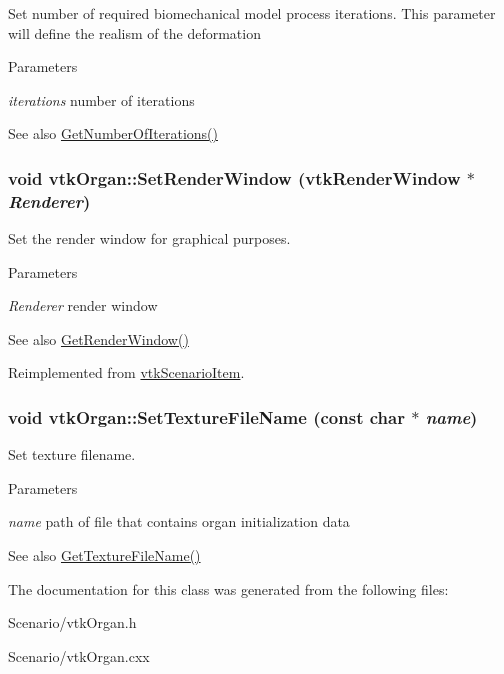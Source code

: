 Set number of required biomechanical model process iterations. This parameter will define the realism of the deformation 
\begin{DoxyParams}{Parameters}
\item[{\em iterations}]number of iterations \end{DoxyParams}
\begin{DoxySeeAlso}{See also}
\hyperlink{classvtkOrgan_a99aeadb34310d5ad8b7d8616ea8482ef}{GetNumberOfIterations()} 
\end{DoxySeeAlso}
\hypertarget{classvtkOrgan_a2b6a862da0f1ca6cd192138cdd00b04b}{
\subsubsection[{SetRenderWindow}]{\setlength{\rightskip}{0pt plus 5cm}void vtkOrgan::SetRenderWindow (vtkRenderWindow $\ast$ {\em Renderer})}}
\label{classvtkOrgan_a2b6a862da0f1ca6cd192138cdd00b04b}


Set the render window for graphical purposes. 
\begin{DoxyParams}{Parameters}
\item[{\em Renderer}]render window \end{DoxyParams}
\begin{DoxySeeAlso}{See also}
\hyperlink{classvtkOrgan_ae670e2727313073a9659a2795ce64c98}{GetRenderWindow()} 
\end{DoxySeeAlso}


Reimplemented from \hyperlink{classvtkScenarioItem_a3ce404404d36c342b947f29fa02b6170}{vtkScenarioItem}.\hypertarget{classvtkOrgan_af19a32e071ae5f9c9848b2ad7088d0c1}{
\subsubsection[{SetTextureFileName}]{\setlength{\rightskip}{0pt plus 5cm}void vtkOrgan::SetTextureFileName (const char $\ast$ {\em name})}}
\label{classvtkOrgan_af19a32e071ae5f9c9848b2ad7088d0c1}


Set texture filename. 
\begin{DoxyParams}{Parameters}
\item[{\em name}]path of file that contains organ initialization data \end{DoxyParams}
\begin{DoxySeeAlso}{See also}
\hyperlink{classvtkOrgan_aaec0735181654c6500d0767eed30b94d}{GetTextureFileName()} 
\end{DoxySeeAlso}


The documentation for this class was generated from the following files:\begin{DoxyCompactItemize}
\item 
Scenario/vtkOrgan.h\item 
Scenario/vtkOrgan.cxx\end{DoxyCompactItemize}
